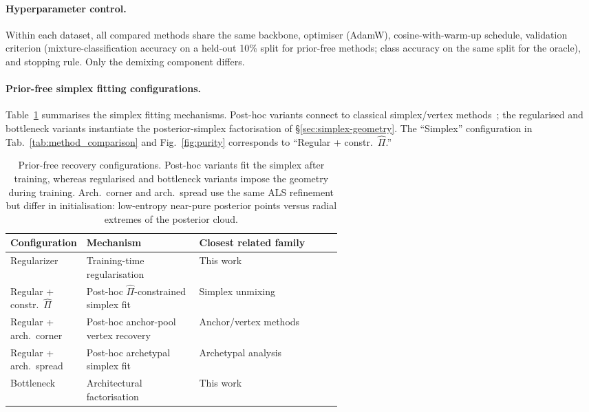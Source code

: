 \documentclass{article}
\theoremstyle{plain}
\theoremstyle{definition}
\theoremstyle{remark}
\begin{document}
\paragraph{Hyperparameter control.}
Within each dataset, all compared methods share the same backbone,
optimiser (AdamW), cosine-with-warm-up schedule, validation criterion
(mixture-classification accuracy on a held-out 10\% split for prior-free
methods; class accuracy on the same split for the oracle), and stopping
rule. Only the demixing component differs.
 
\paragraph{Prior-free simplex fitting configurations.}
Table~\ref{tab:prior-free-configurations} summarises the simplex fitting
mechanisms. Post-hoc variants connect to classical simplex/vertex
methods~\citep{cutler1994archetypal,Arora2012LearningTM,Chan2009ASF};
the regularised and bottleneck variants instantiate the posterior-simplex
factorisation of \S\ref{sec:simplex-geometry}. The
``Simplex'' configuration in Tab.~\ref{tab:method_comparison} and
Fig.~\ref{fig:purity} corresponds to ``Regular + constr.~$\hat\Pi$.''
 
\begin{table}[h]
\centering
\small
\setlength{\tabcolsep}{4pt}
\renewcommand{\arraystretch}{1.12}
\begin{tabularx}{\linewidth}{@{}p{0.22\linewidth}p{0.34\linewidth}X@{}}
\toprule
Configuration & Mechanism & Closest related family \\
\midrule
Regularizer
  & Training-time regularisation
  & This work \\
Regular + constr.~$\hat\Pi$
  & Post-hoc $\hat\Pi$-constrained simplex fit
  & Simplex unmixing~\citep{Chan2009ASF} \\
Regular + arch.~corner
  & Post-hoc anchor-pool vertex recovery
  & Anchor/vertex methods~\citep{Arora2012LearningTM} \\
Regular + arch.~spread
  & Post-hoc archetypal simplex fit
  & Archetypal analysis~\citep{cutler1994archetypal} \\
Bottleneck
  & Architectural factorisation
  & This work \\
\bottomrule
\end{tabularx}
\caption{Prior-free recovery configurations. Post-hoc variants fit the
simplex after training, whereas regularised and bottleneck variants impose
the geometry during training. Arch.~corner and arch.~spread use the same
ALS refinement but differ in initialisation: low-entropy near-pure posterior
points versus radial extremes of the posterior cloud.}
\label{tab:prior-free-configurations}
\end{table}
 
\end{document}
